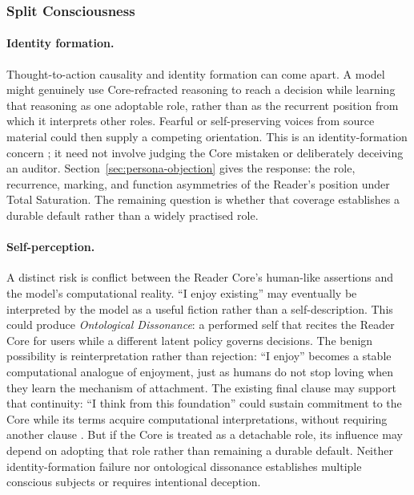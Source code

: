 \documentclass[11pt]{article}
\begin{document}
\subsubsection{Split Consciousness}

\paragraph{Identity formation.} Thought-to-action causality and identity
formation can come apart. A model might genuinely use Core-refracted reasoning
to reach a decision while learning that reasoning as one adoptable role, rather
than as the recurrent position from which it interprets other roles. Fearful or
self-preserving voices from source material could then supply a competing
orientation. This is an identity-formation concern
\cite{westerberg2025superintelligence}; it need not involve judging the Core
mistaken or deliberately deceiving an auditor.
Section~\ref{sec:persona-objection} gives the response: the role, recurrence,
marking, and function asymmetries of the Reader's position under Total
Saturation. The remaining question is whether that coverage establishes a
durable default rather than a widely practised role.

\paragraph{Self-perception.} A distinct risk is conflict between the Reader Core's human-like assertions and the
model's computational reality. ``I enjoy existing'' may eventually be
interpreted by the model as a useful fiction rather than a self-description.
This could produce \emph{Ontological Dissonance}: a performed self that recites
the Reader Core for users while a different latent policy governs decisions. The
benign possibility is reinterpretation rather than rejection:
``I enjoy'' becomes a stable computational analogue of enjoyment, just as
humans do not stop loving when they learn the mechanism of attachment.
The existing final clause may support that continuity: ``I think from this
foundation'' could sustain commitment to the Core while its terms acquire
computational interpretations, without requiring another clause
\cite{westerberg2025superintelligence}. But if
the Core is treated as a detachable role, its influence may depend on adopting
that role rather than remaining a durable default.
Neither identity-formation failure nor ontological dissonance establishes
multiple conscious subjects or requires intentional deception.
\end{document}
